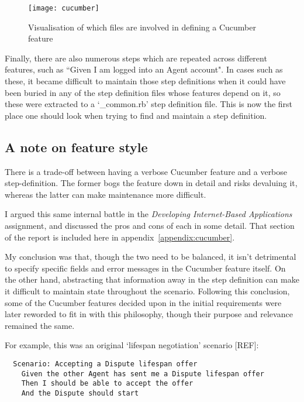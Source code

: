 \begin{figure}[h!]
  \centering
    \ifimages
    \texttt{[image: cucumber]}
    \fi
  \caption{Visualisation of which files are involved in defining a Cucumber feature}
  \label{uml:cucumber}
\end{figure}

Finally, there are also numerous steps which are repeated across different features, such as ``Given I am logged into an Agent account". In cases such as these, it became difficult to maintain those step definitions when it could have been buried in any of the step definition files whose features depend on it, so these were extracted to a `\_common.rb' step definition file. This is now the first place one should look when trying to find and maintain a step definition.

\subsection{A note on feature style}

There is a trade-off between having a verbose Cucumber feature and a verbose step-definition. The former bogs the feature down in detail and risks devaluing it, whereas the latter can make maintenance more difficult.

I argued this same internal battle in the \emph{Developing Internet-Based Applications} assignment, and discussed the pros and cons of each in some detail. That section of the report is included here in appendix~\ref{appendix:cucumber}.

My conclusion was that, though the two need to be balanced, it isn't detrimental to specify specific fields and error messages in the Cucumber feature itself. On the other hand, abstracting that information away in the step definition can make it difficult to maintain state throughout the scenario. Following this conclusion, some of the Cucumber features decided upon in the initial requirements were later reworded to fit in with this philosophy, though their purpose and relevance remained the same.

For example, this was an original `lifespan negotiation' scenario [REF]: %

\begin{lstlisting}
  Scenario: Accepting a Dispute lifespan offer
    Given the other Agent has sent me a Dispute lifespan offer
    Then I should be able to accept the offer
    And the Dispute should start
\end{lstlisting}

